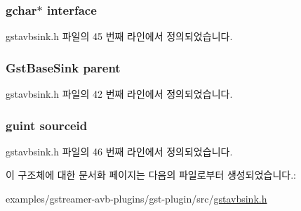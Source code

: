 \subsubsection[{\texorpdfstring{interface}{interface}}]{\setlength{\rightskip}{0pt plus 5cm}gchar$\ast$ interface}\hypertarget{struct___gst_avb_sink_a796aab0c0ba78c463684181ccbcac365}{}\label{struct___gst_avb_sink_a796aab0c0ba78c463684181ccbcac365}


gstavbsink.\+h 파일의 45 번째 라인에서 정의되었습니다.

\subsubsection[{\texorpdfstring{parent}{parent}}]{\setlength{\rightskip}{0pt plus 5cm}Gst\+Base\+Sink parent}\hypertarget{struct___gst_avb_sink_a6759159a23c11964b2c7d2a27a8b121e}{}\label{struct___gst_avb_sink_a6759159a23c11964b2c7d2a27a8b121e}


gstavbsink.\+h 파일의 42 번째 라인에서 정의되었습니다.

\subsubsection[{\texorpdfstring{sourceid}{sourceid}}]{\setlength{\rightskip}{0pt plus 5cm}guint sourceid}\hypertarget{struct___gst_avb_sink_af1aa180762d2e3eab179a2ac3b90be79}{}\label{struct___gst_avb_sink_af1aa180762d2e3eab179a2ac3b90be79}


gstavbsink.\+h 파일의 46 번째 라인에서 정의되었습니다.



이 구조체에 대한 문서화 페이지는 다음의 파일로부터 생성되었습니다.\+:\begin{DoxyCompactItemize}
\item 
examples/gstreamer-\/avb-\/plugins/gst-\/plugin/src/\hyperlink{gstavbsink_8h}{gstavbsink.\+h}\end{DoxyCompactItemize}
